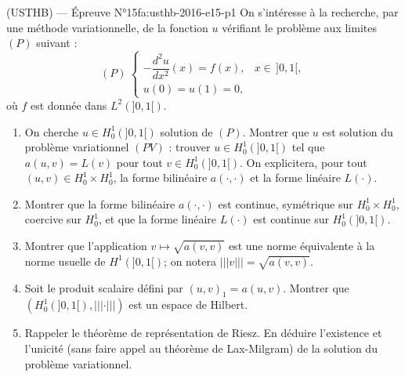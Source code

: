 \begin{problem}{(USTHB) — Épreuve N°15}{fa:usthb-2016-e15-p1}
On s'intéresse à la recherche, par une méthode variationnelle, de la fonction $u$ vérifiant le problème aux limites $(P)$ suivant :
$$(P)\ \begin{cases}-\dfrac{d^2u}{dx^2}(x)=f(x), & x\in\,]0,1[,\\ u(0)=u(1)=0,\end{cases}$$
où $f$ est donnée dans $L^2(]0,1[)$.
\begin{enumerate}\item On cherche $u\in H_0^1(]0,1[)$ solution de $(P)$. Montrer que $u$ est solution du problème variationnel $(PV)$ : trouver $u\in H_0^1(]0,1[)$ tel que $a(u,v)=L(v)$ pour tout $v\in H_0^1(]0,1[)$. On explicitera, pour tout $(u,v)\in H_0^1\times H_0^1$, la forme bilinéaire $a(\cdot,\cdot)$ et la forme linéaire $L(\cdot)$.\item Montrer que la forme bilinéaire $a(\cdot,\cdot)$ est continue, symétrique sur $H_0^1\times H_0^1$, coercive sur $H_0^1$, et que la forme linéaire $L(\cdot)$ est continue sur $H_0^1(]0,1[)$.\item Montrer que l'application $v\mapsto\sqrt{a(v,v)}$ est une norme équivalente à la norme usuelle de $H^1(]0,1[)$; on notera $|||v|||=\sqrt{a(v,v)}$.\item Soit le produit scalaire défini par $(u,v)_1=a(u,v)$. Montrer que $(H_0^1(]0,1[),|||\cdot|||)$ est un espace de Hilbert.\item Rappeler le théorème de représentation de Riesz. En déduire l'existence et l'unicité (sans faire appel au théorème de Lax-Milgram) de la solution du problème variationnel.\end{enumerate}
\end{problem}
\newpage
